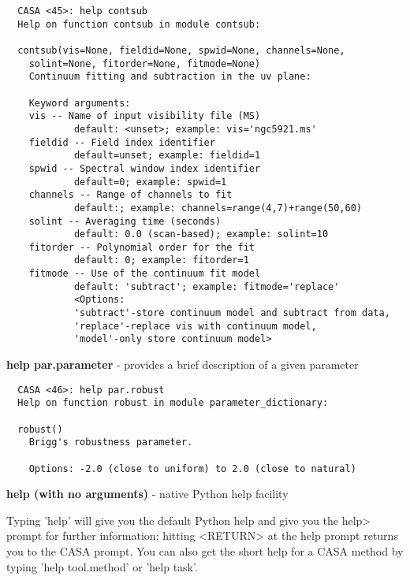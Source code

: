 \small
\begin{verbatim}
  CASA <45>: help contsub
  Help on function contsub in module contsub:

  contsub(vis=None, fieldid=None, spwid=None, channels=None,
    solint=None, fitorder=None, fitmode=None) 
    Continuum fitting and subtraction in the uv plane:

    Keyword arguments:
    vis -- Name of input visibility file (MS)
            default: <unset>; example: vis='ngc5921.ms'
    fieldid -- Field index identifier
            default=unset; example: fieldid=1
    spwid -- Spectral window index identifier
            default=0; example: spwid=1
    channels -- Range of channels to fit
            default:; example: channels=range(4,7)+range(50,60)
    solint -- Averaging time (seconds)
            default: 0.0 (scan-based); example: solint=10
    fitorder -- Polynomial order for the fit
            default: 0; example: fitorder=1
    fitmode -- Use of the continuum fit model
            default: 'subtract'; example: fitmode='replace'
            <Options:
            'subtract'-store continuum model and subtract from data,
            'replace'-replace vis with continuum model,
            'model'-only store continuum model>
\end{verbatim}
\normalsize

{\bf help par.parameter} - provides a brief description of a given parameter
\small
\begin{verbatim}
  CASA <46>: help par.robust
  Help on function robust in module parameter_dictionary:

  robust()
    Brigg's robustness parameter.

    Options: -2.0 (close to uniform) to 2.0 (close to natural)
\end{verbatim}
\normalsize

{\bf help (with no arguments)} - native Python help facility

Typing 'help' will give you the default Python help and give you the
help> prompt for further information; hitting <RETURN> at the help
prompt returns you to the CASA prompt.  You can also get the short
help for a CASA method by typing 'help tool.method' or 'help task'.

